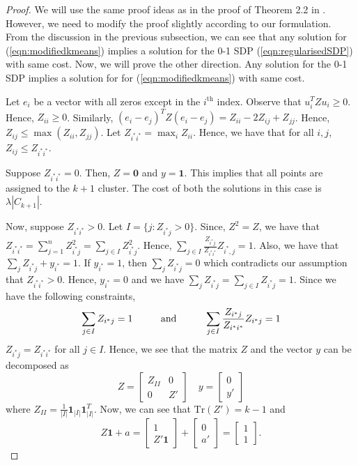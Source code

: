 \documentclass[12pt]{article}
\newcommand{\mb}{\mathbf}
\newcommand{\tr}{\text{Tr}}
\begin{document}
\begin{proof}
We will use the same proof ideas as in the proof of Theorem 2.2 in \cite{peng2007approximating}. However, we need to modify the proof slightly according to our formulation. From the discussion in the previous subsection, we can see that any solution for (\ref{eqn:modifiedkmeans}) implies a solution for the 0-1 SDP (\ref{eqn:regularisedSDP}) with same cost. Now, we will prove the other direction. Any solution for the 0-1 SDP implies a solution for for (\ref{eqn:modifiedkmeans}) with same cost.

Let $e_i$ be a vector with all zeros except in the $i^{\text{th}}$ index. Observe that $u_i^T Z u_i \ge 0$. Hence, $Z_{ii} \ge 0$. Similarly, $(e_i-e_j)^T Z (e_i-e_j) = Z_{ii} - 2Z_{ij} + Z_{jj}$. Hence, $Z_{ij} \le \max (Z_{ii}, Z_{jj})$. Let $Z_{i^*i^*} = \max_i Z_{ii}$. Hence, we have that for all $i, j$, $Z_{ij} \le Z_{i^* i^*}$. 

Suppose $Z_{i^*i^*} = 0$. Then, $Z = \textbf{0}$ and $y = \textbf{1}$. This implies that all points are assigned to the $k+1$ cluster. The cost of both the solutions in this case is $\lambda |C_{k+1}|$.

Now, suppose $Z_{i^*i^*}>0$. Let $I =\{j: Z_{i^* j} > 0\}$. Since, $Z^2 = Z$, we have that $Z_{i^*i^*} = \sum_{j=1}^n Z^2_{i^* j} = \sum_{j \in I} Z^2_{i^*j}$. Hence, $\sum_{j \in I}\frac{Z_{i^*j}}{Z_{i^*i^*}}Z_{i^*, j} = 1$. Also, we have that $\sum_{j} Z_{i^*j} + y_{i^*} = 1$. If $y_{i^*} = 1$, then $\sum_{j} Z_{i^*j} = 0$ which contradicts our assumption that $Z_{i^*i^*} > 0$. Hence, $y_{i^*} = 0$ and we have $\sum_{j} Z_{i^*j} = \sum_{j\in I} Z_{i^*j} = 1$. Since we have the following constraints,
\begin{align*}
	\sum_{j\in I} Z_{i^*j} = 1 \hspace{0.4in}\text{and} \hspace{0.4in}\sum_{j\in I} \frac{Z_{i^*j}}{Z_{i^*i^*}}Z_{i^*j} = 1
\end{align*}
$Z_{i^*j} = Z_{i^*i^*}$ for all $j \in I$. Hence, we see that the matrix $Z$ and the vector $y$ can be decomposed as 
\[ Z = 
\begin{bmatrix}
    Z_{II}  & 0 \\
    0       & Z'
\end{bmatrix}
\quad y=\begin{bmatrix}
    0 \\
    y' 
\end{bmatrix}
\]
where $Z_{II} = \frac{1}{|I|}\mb1_{|I|}\mb1_{|I|}^T$. Now, we can see that $\tr(Z') = k-1$ and
$$Z\mb 1 + a = \begin{bmatrix}1\\Z'\mb 1\end{bmatrix} + \begin{bmatrix}0\\a'\end{bmatrix} = \begin{bmatrix}1\\1\end{bmatrix}.$$


\end{proof}
\end{document}
